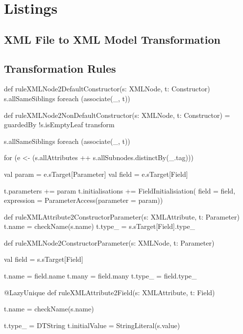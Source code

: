 
\section{Listings}

\subsection{XML File to XML Model Transformation}
\label{sec:XMLTransfromation}

\subsection{Transformation Rules}
\label{sec:TransformationRules}

\begin{scalacode}
def ruleXMLNode2DefaultConstructor(s: XMLNode, t: Constructor) {
  s.allSameSiblings foreach (associate(_, t))
}
\end{scalacode}

\begin{scalacode}
def ruleXMLNode2NonDefaultConstructor(s: XMLNode, t: Constructor) = guardedBy {
  !s.isEmptyLeaf
} transform {

  s.allSameSiblings foreach (associate(_, t))

  for (e <- (s.allAttributes ++ s.allSubnodes.distinctBy(_.tag))) {
    val param = e.sTarget[Parameter]
    val field = e.sTarget[Field]

    t.parameters += param
    t.initialisations += FieldInitialisiation(
      field = field,
      expression = ParameterAccess(parameter = param))
  }
}
\end{scalacode}

\begin{scalacode}
def ruleXMLAttribute2ConstructorParameter(s: XMLAttribute, t: Parameter) {
  t.name = checkName(s.name)
  t.type_ = s.sTarget[Field].type_
}
\end{scalacode}

\begin{scalacode}
def ruleXMLNode2ConstructorParameter(s: XMLNode, t: Parameter) {
  val field = s.sTarget[Field]

  t.name = field.name
  t.many = field.many
  t.type_ = field.type_
}
\end{scalacode}

\begin{scalacode}
@LazyUnique
def ruleXMLAttribute2Field(s: XMLAttribute, t: Field) {
  t.name = checkName(s.name)

  t.type_ = DTString
  t.initialValue = StringLiteral(s.value)
}
\end{scalacode}

